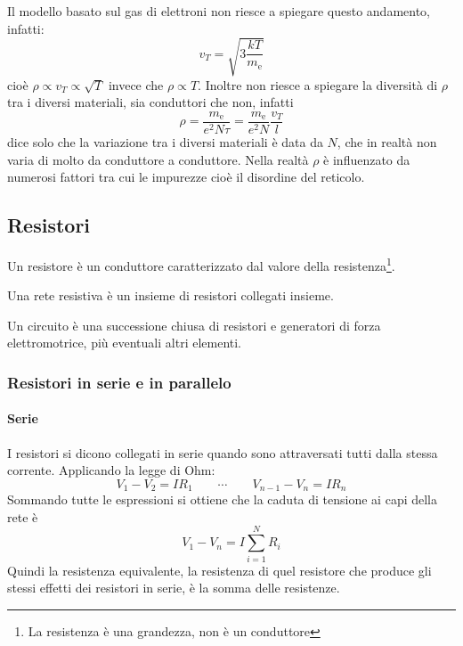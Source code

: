 Il modello basato sul gas di elettroni non riesce a spiegare questo andamento, infatti:
\[v_T=\sqrt{3\frac{kT}{m_\mathrm{e}}}\]
cioè $\rho\propto v_T\propto\sqrt{T}$ invece che $\rho\propto T$. Inoltre non riesce a spiegare la diversità di $\rho$ tra i diversi materiali, sia conduttori che non, infatti
\[\rho=\frac{m_\mathrm{e}}{e^2N\tau}=\frac{m_\mathrm{e}}{e^2N}\frac{v_T}{l}\]
dice solo che la variazione tra i diversi materiali è data da $N$, che in realtà non varia di molto da conduttore a conduttore. Nella realtà $\rho$ è influenzato da numerosi fattori tra cui le impurezze cioè il disordine del reticolo.

\subsection{Resistori}
\begin{Def}
  Un resistore è un conduttore caratterizzato dal valore della resistenza\footnote{La resistenza è una grandezza, non è un conduttore}.
\end{Def}
\begin{Def}
  Una rete resistiva è un insieme di resistori collegati insieme.
\end{Def}
\begin{Def}
  Un circuito è una successione chiusa di resistori e generatori di forza elettromotrice, più eventuali altri elementi.
\end{Def}
\subsubsection{Resistori in serie e in parallelo}
\paragraph{Serie}
I resistori si dicono collegati in serie quando sono attraversati tutti dalla stessa corrente. Applicando la legge di Ohm:
\[V_1-V_2=IR_1\qquad \cdots \qquad V_{n-1}-V_{n}=IR_n\]
Sommando tutte le espressioni si ottiene che la caduta di tensione ai capi della rete è
\[V_1-V_n=I\sum_{i=1}^N R_i\]
Quindi la resistenza equivalente, la resistenza di quel resistore che produce gli stessi effetti dei resistori in serie, è la somma delle resistenze.
